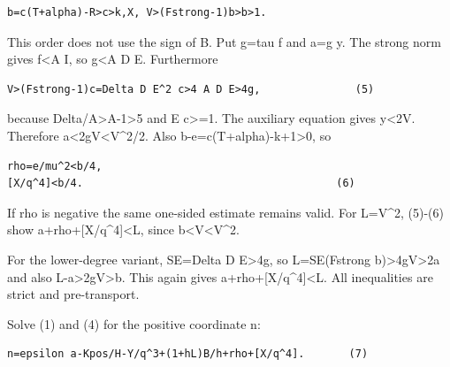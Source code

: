 \begin{verbatim}
b=c(T+alpha)-R>c>k,X, V>(Fstrong-1)b>b>1.
\end{verbatim}

This order does not use the sign of B. Put g=\allowbreak{}tau f and a=\allowbreak{}g y. The strong norm gives f\textless{}\allowbreak{}A I, so g\textless{}\allowbreak{}A D E. Furthermore



\begin{verbatim}
V>(Fstrong-1)c=Delta D E^2 c>4 A D E>4g,               (5)
\end{verbatim}

because Delta/\allowbreak{}A\textgreater{}\allowbreak{}A-1\textgreater{}\allowbreak{}5 and E c\textgreater{}\allowbreak{}=\allowbreak{}1. The auxiliary equation gives y\textless{}\allowbreak{}2V. Therefore a\textless{}\allowbreak{}2gV\textless{}\allowbreak{}V\textasciicircum{}\allowbreak{}2/\allowbreak{}2. Also b-e=\allowbreak{}c(T+\allowbreak{}alpha)-k+\allowbreak{}1\textgreater{}\allowbreak{}0, so



\begin{verbatim}
rho=e/mu^2<b/4,
[X/q^4]<b/4.                                        (6)
\end{verbatim}

If rho is negative the same one-sided estimate remains valid. For L=\allowbreak{}V\textasciicircum{}\allowbreak{}2, (5)-(6) show a+\allowbreak{}rho+\allowbreak{}[X/\allowbreak{}q\textasciicircum{}\allowbreak{}4]\textless{}\allowbreak{}L, since b\textless{}\allowbreak{}V\textless{}\allowbreak{}V\textasciicircum{}\allowbreak{}2.



For the lower-degree variant, SE=\allowbreak{}Delta D E\textgreater{}\allowbreak{}4g, so L=\allowbreak{}SE(Fstrong b)\textgreater{}\allowbreak{}4gV\textgreater{}\allowbreak{}2a and also L-a\textgreater{}\allowbreak{}2gV\textgreater{}\allowbreak{}b. This again gives a+\allowbreak{}rho+\allowbreak{}[X/\allowbreak{}q\textasciicircum{}\allowbreak{}4]\textless{}\allowbreak{}L. All inequalities are strict and pre-transport.



Solve (1) and (4) for the positive coordinate n:



\begin{verbatim}
n=epsilon a-Kpos/H-Y/q^3+(1+hL)B/h+rho+[X/q^4].       (7)
\end{verbatim}

